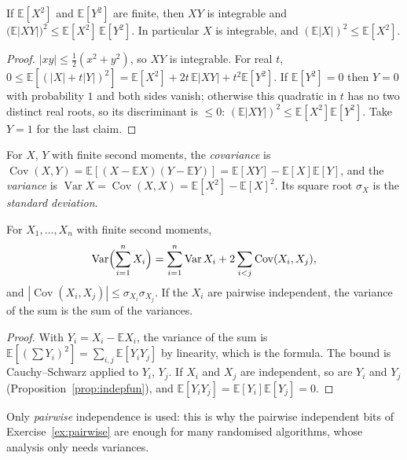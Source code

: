 \begin{proposition}\label{prop:cs}
If $\mathbb E[X^2]$ and $\mathbb E[Y^2]$ are finite, then $XY$ is integrable and $\bigl(\mathbb E|XY|\bigr)^2\le\mathbb E[X^2]\,\mathbb E[Y^2]$. In
particular $X$ is integrable, and $(\mathbb E|X|)^2\le\mathbb E[X^2]$.
\end{proposition}
\begin{proof}
$|xy|\le\frac12(x^2+y^2)$, so $XY$ is integrable. For real $t$, $0\le\mathbb E[(|X|+t|Y|)^2]=\mathbb E[X^2]+2t\,\mathbb E|XY|+t^2\mathbb E[Y^2]$. If
$\mathbb E[Y^2]=0$ then $Y=0$ with probability $1$ and both sides vanish; otherwise this quadratic in $t$ has no two
distinct real roots, so its discriminant is $\le0$: $(\mathbb E|XY|)^2\le\mathbb E[X^2]\mathbb E[Y^2]$. Take $Y=1$ for the last claim.
\end{proof}

\begin{definition}
For $X$, $Y$ with finite second moments, the \emph{covariance} is $\operatorname{Cov}(X,Y)=\mathbb E[(X-\mathbb EX)(Y-\mathbb EY)]=\mathbb E[XY]-\mathbb E[X]\mathbb E[Y]$, and
the \emph{variance} is $\operatorname{Var}X=\operatorname{Cov}(X,X)=\mathbb E[X^2]-\mathbb E[X]^2$. Its square root $\sigma_X$ is the \emph{standard deviation}.
\end{definition}

\begin{proposition}\label{prop:varsum}
For $X_1,\dots,X_n$ with finite second moments,
\[
\operatorname{Var}\Bigl(\sum_{i=1}^nX_i\Bigr)=\sum_{i=1}^n\operatorname{Var}X_i+2\sum_{i<j}\operatorname{Cov}(X_i,X_j),
\]
and $|\operatorname{Cov}(X_i,X_j)|\le\sigma_{X_i}\sigma_{X_j}$. If the $X_i$ are pairwise independent, the variance of the sum is the sum of the
variances.
\end{proposition}
\begin{proof}
With $Y_i=X_i-\mathbb EX_i$, the variance of the sum is $\mathbb E[(\sum Y_i)^2]=\sum_{i,j}\mathbb E[Y_iY_j]$ by linearity, which is the formula. The
bound is Cauchy--Schwarz applied to $Y_i$, $Y_j$. If $X_i$ and $X_j$ are independent, so are $Y_i$ and $Y_j$
(Proposition~\ref{prop:indepfun}), and $\mathbb E[Y_iY_j]=\mathbb E[Y_i]\mathbb E[Y_j]=0$.
\end{proof}

Only \emph{pairwise} independence is used: this is why the pairwise independent bits of Exercise~\ref{ex:pairwise}
are enough for many randomised algorithms, whose analysis only needs variances.

